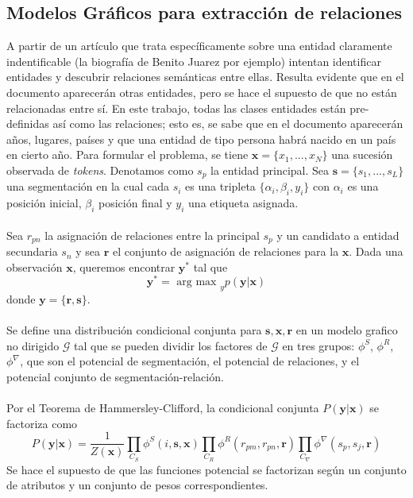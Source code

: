 \documentclass[11pt]{article}
\theoremstyle{plain}
\begin{document}
\subsection{Modelos Gráficos para extracción de relaciones}
A partir de un artículo que trata específicamente sobre una entidad claramente indentificable (la biografía de Benito Juarez por ejemplo) \cite{yu2010jointly} intentan identificar entidades y descubrir relaciones semánticas entre ellas. Resulta evidente que en el documento aparecerán otras entidades, pero se hace el supuesto de que no están relacionadas entre sí. En este trabajo, todas las clases entidades están pre-definidas así como las relaciones; esto es, se sabe que en el documento aparecerán años, lugares, países y que una entidad de tipo persona habrá nacido en un país en cierto año. Para formular el problema, se tiene $\mathbf{x} = \{ x_1,...,x_N \}$ una sucesión observada de \textit{tokens}. Denotamos como $s_p$ la entidad principal. Sea $ \mathbf{s}=\{ s_1,...,s_L\}$ una segmentación en la cual cada $s_i$ es una tripleta $\{ \alpha_i, \beta_i,y_i \}$ con $\alpha_i$ es una posición inicial, $\beta_i$ posición final y $y_i$ una etiqueta asignada.\\
\\
Sea $r_{pn}$ la asignación de relaciones entre la principal $s_p$ y un candidato a entidad secundaria $s_n$ y sea $\mathbf{r}$ el conjunto de asignación de relaciones para la $\mathbf{x}$. Dada una observación $\mathbf{x}$, queremos encontrar $\mathbf{y}^\ast$ tal que
\[ \mathbf{y}^\ast = \textrm{ arg max }_y p(\mathbf{y}| \mathbf{x})\]
donde $\mathbf{y}=\{ \mathbf{r},\mathbf{s} \}$.\\
\\
Se define una distribución condicional conjunta para $\mathbf{s},\mathbf{x},\mathbf{r}$ en un modelo grafico no dirigido $\mathcal{G}$ tal que se pueden dividir los factores de $\mathcal{G}$ en tres grupos: $\phi^S$, $\phi^R$, $\phi^\nabla$, que son el potencial de segmentación, el potencial de relaciones, y el potencial conjunto de segmentación-relación. \\
\\
Por el Teorema de Hammersley-Clifford, la condicional conjunta $P(\mathbf{y} | \mathbf{x})$ se factoriza como
\[ P(\mathbf{y} | \mathbf{x}) = \frac{1}{Z(\mathbf{x})} \prod_{C_S} \phi^S (i,\mathbf{s},\mathbf{x}) \prod_{C_R}\phi^R(r_{pm},r_{pn},\mathbf{r}) \prod_{C_\nabla} \phi^\nabla(s_p,s_j,\mathbf{r}) \]
Se hace el supuesto de que las funciones potencial se factorizan según un conjunto de atributos y un conjunto de pesos correspondientes.\\
\end{document}
